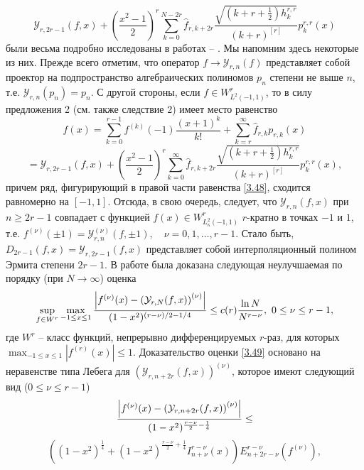 \begin{equation}\label{3.47}
\mathcal{ Y}_{r,2r-1}(f,x)+\left(\frac{x^2-1}2\right)^r\sum_{k=0}^{N-2r}\hat f_{r,k+2r} \frac{\sqrt{(k+r+\frac12)h_k^{r,r}}}{ (k+r)^{[r]}}p_{k}^{r,r}(x)
\end{equation}
 были весьма подробно исследованы в работах \cite{Shar11} -- \cite{sharap3}. Мы напомним здесь некоторые из них. Прежде всего отметим, что оператор  $f\to \mathcal{ Y}_{r,n}(f)$ представляет собой проектор на подпространство алгебраических полиномов $p_n$ степени не выше $n$, т.е. $\mathcal{ Y}_{r,n}(p_n)=p_n$. С другой стороны, если $f\in W^r_{L^2(-1,1)}$, то в силу предложения 2 (см. также следствие 2) имеет место равенство
$$
f(x)=\sum_{k=0}^{r-1} f^{(k)}(-1)\frac{(x+1)^k}{k!}+\sum_{k=r}^\infty \hat f_{r,k}p_{r,k}(x)
$$
\begin{equation}\label{3.48}
=\mathcal{ Y}_{r,2r-1}(f,x)+\left(\frac{x^2-1}2\right)^r\sum_{k=0}^\infty\hat f_{r,k+2r} \frac{\sqrt{(k+r+\frac12)h_k^{r,r}}}{ (k+r)^{[r]}}p_{k}^{r,r}(x),
\end{equation}
причем ряд, фигурирующий в правой части равенства \eqref{3.48}, сходится равномерно на $[-1,1]$. Отсюда, в свою очередь, следует, что   $\mathcal{ Y}_{r,n}(f,x)$ при $n\ge2r-1 $ совпадает с функцией $f(x)\in W^r_{L^2_\kappa(-1,1)}$ $r$-кратно в точках $-1$ и $1$, т.е. $f^{(\nu)}(\pm1)=\mathcal{ Y}_{r,n}^{(\nu)}(f,\pm1),\quad \nu=0,1,\ldots, r-1$. Стало быть,
 $D_{2r-1}(f,x)=\mathcal{ Y}_{r,2r-1}(f,x)$
представляет собой \cite{Shar17} интерполяционный полином Эрмита степени $2r-1$.
В работе \cite{Shar15}  была доказана следующая неулучшаемая по порядку (при $N\to\infty$) оценка
\begin{equation}\label{3.49}
\sup_{f\in W^r}\max_{-1\le x\le 1}{\left|f^{(\nu)}(x)-\left(\mathcal{ Y}_{r,N}(f,x)\right)^{(\nu)}\right|\over(1-x^2)^{(r-\nu)/2-1/4}}
\le c(r)\frac{\ln N}{N^{r-\nu}},\,\, 0\le \nu\le r-1,
\end{equation}
 где  $W^r$ -- класс функций, непрерывно дифференцируемых $r$-раз, для которых $\max_{-1\le x\le 1}|f^{(r)}(x)|\le1$.
Доказательство оценки \eqref{3.49}  основано \cite{Shar15} на неравенстве типа Лебега для $(\mathcal{ Y}_{r,n+2r}(f,x))^{(\nu)}$, которое имеют следующий вид ($0\le\nu\le r-1$)
$$
{\left|f^{(\nu)}(x)-\left(\mathcal{ Y}_{r,n+2r}(f,x)\right)^{(\nu)}\right|
\over(1-x^2)^{\frac{r-\nu}{2}-\frac14}}\le
$$
  \begin{equation}\label{3.50}
    ((1-x^2)^\frac14+(1-x^2)^{\frac{r-\nu}{2}+\frac14}I^{r-\nu}_{n+\nu}(x))
E^{r-\nu}_{n+2r-\nu}(f^{(\nu)}),
\end{equation}
